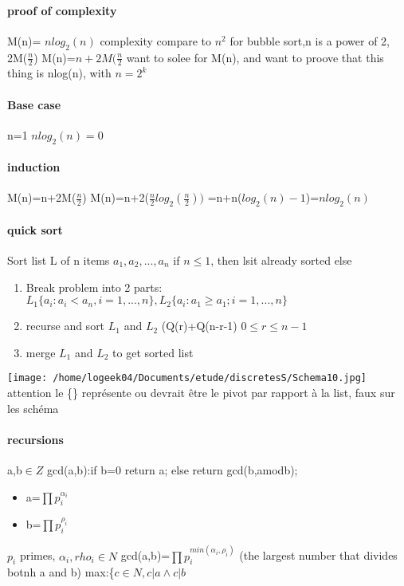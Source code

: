 \documentclass[a4paper,10pt]{article}
\begin{document}
\paragraph{proof of complexity}
M(n)= $nlog_2(n)$ complexity compare to $n^2$ for bubble sort,n is a power of 2, 2M($\frac{n}{2}$)
\newline
M(n)=$n+2M(\frac{n}{2}$ want to solee for M(n), and want to proove that this thing is nlog(n), with $n=2^k$
\paragraph{Base case}
n=1 $nlog_2(n)=0$
\paragraph{induction}
M(n)=n+2M($\frac{n}{2}$)
\newline
M(n)=n+2($\frac{n}{2}log_2(\frac{n}{2}))$
\newline
=n+n($log_2(n)-1$)=$nlog_2(n)$
\paragraph{quick sort}
Sort list L of n items $a_1,a_2,...,a_n$
\newline
if $n\leq 1$, then lsit already sorted 
\newline
else
\begin{enumerate}
 \item Break problem into 2 parts: $L_1\{a_{i}:a_i<a_n,i=1,...,n\},L_2\{a_i:a_1\geq a_1;i=1,...,n\}$
 \item recurse and sort $L_1$ and $L_2$ (Q(r)+Q(n-r-1) $0\leq r\leq n-1$
 \item merge $L_1$ and $L_2$ to get sorted list
\end{enumerate}
\texttt{[image: /home/logeek04/Documents/etude/discretesS/Schema10.jpg]}
\newline
attention le \{\} représente ou devrait être le pivot par rapport à la list, faux sur les schéma 
\paragraph{recursions}
a,b$\in Z$
\newline
gcd(a,b):if b=0 return a; else return gcd(b,amodb);
\newline
\begin{itemize}
 \item a=$\prod p_i^{\alpha_i}$
 \item b=$\prod p_i^{\rho_i}$
\end{itemize}
$p_i$ primes, $\alpha_i,rho_i\in N$
\newline
gcd(a,b)=$\prod p_i^{min(\alpha_i,\rho_i)}$ (the largest number that divides botnh a and b)
\newline
max:\{$c\in N, c|a\wedge c|b$\
\end{document}
